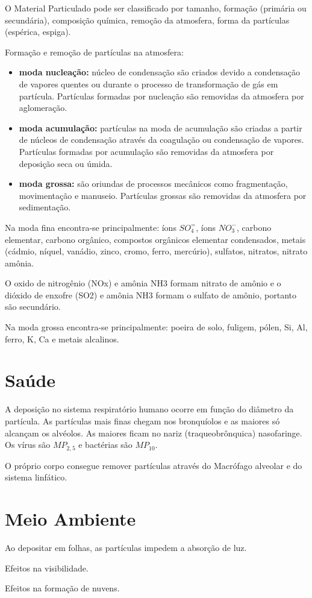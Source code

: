 O Material Particulado pode ser classificado por tamanho, formação 
(primária ou secundária), composição química, remoção da atmosfera, 
forma da partículas (espérica, espiga).

Formação e remoção de partículas na atmosfera:
\begin{itemize}
  \item \textbf{moda nucleação:} núcleo de condensação são criados devido a 
        condensação de vapores quentes ou durante o processo de 
        transformação de gás em partícula. Partículas formadas por 
        nucleação são removidas da atmosfera por aglomeração. 
  \item \textbf{moda acumulação:} partículas na moda de acumulação são criadas 
         a partir de núcleos de condensação através da coagulação ou 
         condensação de vapores. Partículas formadas por acumulação
         são removidas da atmosfera por deposição seca ou úmida.
  \item \textbf{moda grossa:} são oriundas de processos mecânicos como fragmentação, 
        movimentação e manuseio. Partículas grossas são removidas da atmosfera 
        por sedimentação.
\end{itemize}


Na moda fina encontra-se principalmente: íons $SO_4^=$, 
íons $ NO_3^-$, carbono elementar, carbono orgânico, compostos orgânicos elementar
condensados, metais (cádmio, níquel, vanádio, zinco, cromo, ferro, mercúrio), 
sulfatos, nitratos, nitrato amônia. 

O oxido de nitrogênio (NOx) e amônia NH3 formam  nitrato de amônio e 
o dióxido de enxofre (SO2) e amônia NH3 formam o sulfato de amônio, 
portanto são secundário. 

Na moda grossa encontra-se principalmente: poeira de solo, fuligem, 
pólen, Si, Al, ferro, K, Ca e metais alcalinos.

\section{Saúde}

A deposição no sistema respiratório humano ocorre em função do diâmetro da partícula.
As partículas mais finas chegam nos bronquíolos e as maiores só alcançam os alvéolos.
As maiores ficam no nariz (traqueobrônquica) nasofaringe. 
Os vírus são $MP_{2,5}$ e bactérias são $MP_{10}$. 

O próprio corpo consegue remover partículas através do Macrófago alveolar 
e do sistema linfático. 

\section{Meio Ambiente}
Ao depositar em folhas, as partículas impedem a absorção de luz. 

Efeitos na visibilidade.

Efeitos na formação de nuvens.


